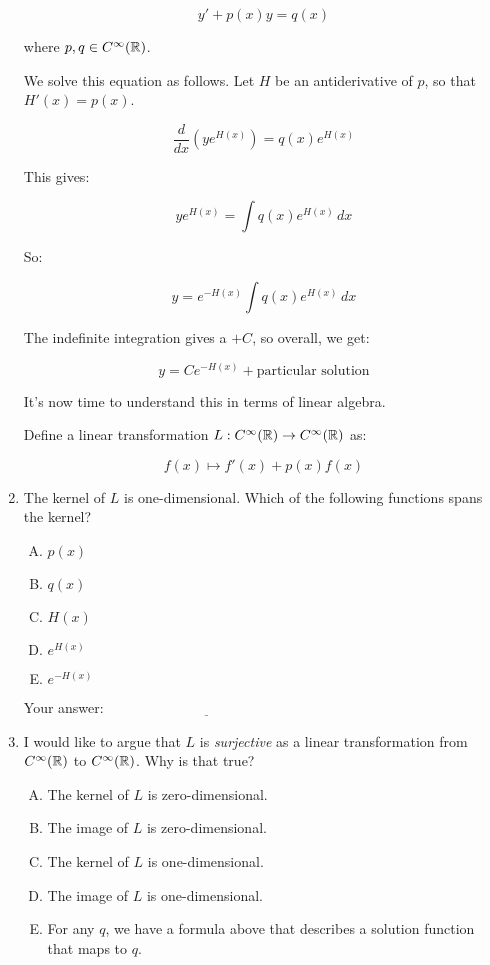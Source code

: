 \documentclass[10pt]{amsart}
\begin{document}
\begin{enumerate}
  $$y' + p(x)y = q(x)$$

  where $p,q \in C^\infty(\mathbb{R})$.

  We solve this equation as follows. Let $H$ be an antiderivative of
  $p$, so that $H'(x) = p(x)$. 

  $$\frac{d}{dx}\left(ye^{H(x)}\right) = q(x)e^{H(x)}$$

  This gives:

  $$ye^{H(x)}  = \int q(x)e^{H(x)} \, dx$$
  
  So:

  $$y = e^{-H(x)}\int q(x)e^{H(x)} \, dx$$

  The indefinite integration gives a $+C$, so overall, we get:

  $$y = Ce^{-H(x)} + \text{particular solution}$$

  It's now time to understand this in terms of linear algebra.

  Define a linear transformation $L:C^\infty(\mathbb{R}) \to C^\infty(\mathbb{R})$ as:

  $$f(x) \mapsto f'(x) + p(x)f(x)$$

\item The kernel of $L$ is one-dimensional. Which of the following
  functions spans the kernel?

  \begin{enumerate}[(A)]
  \item $p(x)$
  \item $q(x)$
  \item $H(x)$
  \item $e^{H(x)}$
  \item $e^{-H(x)}$
  \end{enumerate}

  \vspace{0.1in}
  Your answer: $\underline{\qquad\qquad\qquad\qquad\qquad\qquad\qquad}$
  \vspace{0.1in}

\item I would like to argue that $L$ is {\em surjective} as a linear
  transformation from $C^\infty(\mathbb{R})$ to $C^\infty(\mathbb{R})$. Why is that
  true?

  \begin{enumerate}[(A)]
  \item The kernel of $L$ is zero-dimensional.
  \item The image of $L$ is zero-dimensional.
  \item The kernel of $L$ is one-dimensional.
  \item The image of $L$ is one-dimensional.
  \item For any $q$, we have a formula above that describes a solution
    function that maps to $q$.
  \end{enumerate}


\end{enumerate}
\end{document}
